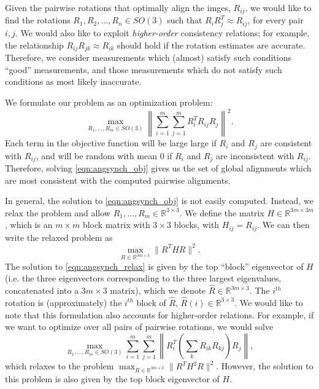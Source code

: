\documentclass[twocolumn, 11pt]{article}
\begin{document}
Given the pairwise rotations that optimally align the imges, $R_{ij}$, we would like to find the rotations $R_1, R_2, \dots, R_n \in SO(3)$ such that $R_i R_j^T \approx R_{ij}$, for every pair $i, j$. 
%
We would also like to exploit {\em higher-order} consistency relations;
for example, the relationship $R_{ij} R_{jk} \approx R_{ik}$ should hold if the rotation estimates are accurate.
%
Therefore, we consider measurements which (almost) satisfy such conditions ``good'' measurements, and those measurements which do not satisfy such conditions as most likely inaccurate.


We formulate our problem as an optimization problem:
\begin{equation} \label{eqn:angsynch_obj}
\max_{R_1, \dots, R_m \in SO(3)} \left\| \sum_{i=1}^{m} \sum_{j=1}^{m} R_i^T R_{ij} R_j \right\|^2.
\end{equation}
%
Each term in the objective function will be large large if $R_i$ and $R_j$ are consistent with $R_{ij}$, and will be random with mean 0 if $R_i$ and $R_j$ are inconsistent with $R_{ij}$.
%
Therefore, solving \eqref{eqn:angsynch_obj} gives us the set of global alignments which are most consistent with the computed pairwise alignments.

In general, the solution to \eqref{eqn:angsynch_obj} is not easily computed.
%
Instead, we relax the problem and allow $R_1, \dots, R_m \in \mathbb{R}^{3 \times 3}$.
%
We define the matrix $H \in \mathbb{R}^{3m \times 3m}$, which is an $m \times m$ block matrix with $3 \times 3$ blocks, with $H_{ij} = R_{ij}$.
%
We can then write the relaxed problem as 
\begin{equation} \label{eqn:angsynch_relax}
\max_{R\in \mathbb{R}^{3m \times 3}} \| R^T H R \|^2.
\end{equation}
%
The solution to \eqref{eqn:angsynch_relax} is given by the top ``block'' eigenvector of $H$ (i.e. the three eigenvectors corresponding to the three largest eigenvalues, concatenated into a $3m \times 3$ matrix), which we denote $\hat{R} \in \mathbb{R}^{3m \times 3}$. 
%
The $i^{th}$ rotation is (approximately) the $i^{th}$ block of $\hat{R}$, $\hat{R}(i) \in \mathbb{R}^{3 \times 3}$.
%
We would like to note that this formulation also accounts for higher-order relations.
%
For example, if we want to optimize over all pairs of pairwise rotations, we would solve 
\begin{equation}
\max_{R_1, \dots, R_m \in SO(3)} \sum_{i=1}^{m} \sum_{j=1}^{m} \left\| R_i^T \left( \sum_k R_{ik} R_{kj} \right) R_j \right\|,
\end{equation} 
%
which relaxes to the problem $ \max_{R \in \mathbb{R}^{3m \times 3}} \| R^T H^2 R \|^2$.
%
However, the solution to this problem is also given by the top block eigenvector of $H$. 
\end{document}
